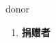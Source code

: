 
\begin{frame}
{\huge donor}
\begin{center}
\begin{enumerate}\Large
  \item \textbf{捐赠者}
\end{enumerate}
\end{center}
\end{frame}
